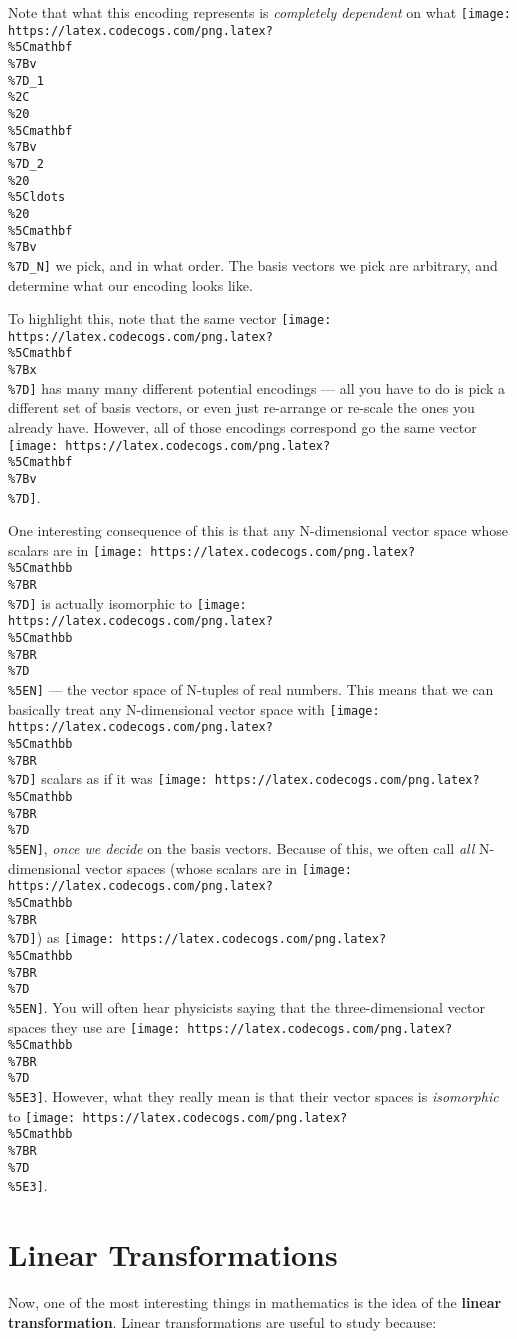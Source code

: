 \documentclass[]{article}
\begin{document}
Note that what this encoding represents is \emph{completely dependent} on what
\texttt{[image: https://latex.codecogs.com/png.latex?\\\%5Cmathbf\\\%7Bv\\\%7D\_1\\\%2C\\\%20\\\%5Cmathbf\\\%7Bv\\\%7D\_2\\\%20\\\%5Cldots\\\%20\\\%5Cmathbf\\\%7Bv\\\%7D\_N]}
we pick, and in what order. The basis vectors we pick are arbitrary, and
determine what our encoding looks like.

To highlight this, note that the same vector
\texttt{[image: https://latex.codecogs.com/png.latex?\\\%5Cmathbf\\\%7Bx\\\%7D]} has
many many different potential encodings --- all you have to do is pick a
different set of basis vectors, or even just re-arrange or re-scale the ones you
already have. However, all of those encodings correspond go the same vector
\texttt{[image: https://latex.codecogs.com/png.latex?\\\%5Cmathbf\\\%7Bv\\\%7D]}.

One interesting consequence of this is that any N-dimensional vector space whose
scalars are in
\texttt{[image: https://latex.codecogs.com/png.latex?\\\%5Cmathbb\\\%7BR\\\%7D]} is
actually isomorphic to
\texttt{[image: https://latex.codecogs.com/png.latex?\\\%5Cmathbb\\\%7BR\\\%7D\\\%5EN]}
--- the vector space of N-tuples of real numbers. This means that we can
basically treat any N-dimensional vector space with
\texttt{[image: https://latex.codecogs.com/png.latex?\\\%5Cmathbb\\\%7BR\\\%7D]}
scalars as if it was
\texttt{[image: https://latex.codecogs.com/png.latex?\\\%5Cmathbb\\\%7BR\\\%7D\\\%5EN]},
\emph{once we decide} on the basis vectors. Because of this, we often call
\emph{all} N-dimensional vector spaces (whose scalars are in
\texttt{[image: https://latex.codecogs.com/png.latex?\\\%5Cmathbb\\\%7BR\\\%7D]}) as
\texttt{[image: https://latex.codecogs.com/png.latex?\\\%5Cmathbb\\\%7BR\\\%7D\\\%5EN]}.
You will often hear physicists saying that the three-dimensional vector spaces
they use are
\texttt{[image: https://latex.codecogs.com/png.latex?\\\%5Cmathbb\\\%7BR\\\%7D\\\%5E3]}.
However, what they really mean is that their vector spaces is \emph{isomorphic}
to
\texttt{[image: https://latex.codecogs.com/png.latex?\\\%5Cmathbb\\\%7BR\\\%7D\\\%5E3]}.

\hypertarget{linear-transformations}{%
\section{Linear Transformations}\label{linear-transformations}}

Now, one of the most interesting things in mathematics is the idea of the
\textbf{linear transformation}. Linear transformations are useful to study
because:
\end{document}

